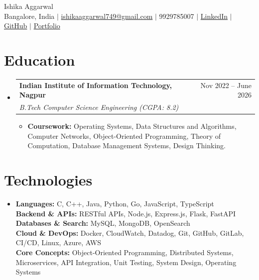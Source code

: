 \documentclass[letterpaper,11pt]{article}
\makeatletter
\newcommand{\resumeItem}[1]{
  \item\small{
    {#1 \vspace{-2pt}}
  }
}
\newcommand{\resumeSubheading}[4]{
  \vspace{-2pt}\item
    \begin{tabular*}{0.97\textwidth}[t]{l@{\extracolsep{\fill}}r}
      \textbf{#1} & #2 \\
      \textit{\small#3} & \textit{\small #4} \\
    \end{tabular*}\vspace{-7pt}
}
\newcommand{\resumeSubHeadingListStart}{\begin{itemize}[leftmargin=0.15in, label={}]}
\newcommand{\resumeSubHeadingListEnd}{\end{itemize}}
\newcommand{\resumeItemListStart}{\begin{itemize}[leftmargin=0.2in, topsep=2pt, itemsep=3.5pt, parsep=0pt, partopsep=0pt]}
\newcommand{\resumeItemListEnd}{\end{itemize}\vspace{-4pt}}
\makeatother
\begin{document}
\begin{center}
    {\Huge Ishika Aggarwal} \\ \vspace{3pt}
    \small
    Bangalore, India $|$
    \href{mailto:ishikaaggarwal749@gmail.com}{ishikaaggarwal749@gmail.com} $|$
    9929785007 $|$
    \href{https://www.linkedin.com/in/your-linkedin}{LinkedIn} $|$
    \href{https://github.com/your-github}{GitHub} $|$
    \href{https://your-portfolio.com}{Portfolio}
\end{center}

\section{Education}
  \resumeSubHeadingListStart
    \resumeSubheading
      {Indian Institute of Information Technology, Nagpur}{Nov 2022 -- June 2026}
      {B.Tech Computer Science Engineering \quad (CGPA: 8.2)}{}
      \resumeItemListStart
        \resumeItem{\textbf{Coursework:} Operating Systems, Data Structures and Algorithms, Computer Networks, Object-Oriented Programming, Theory of Computation, Database Management Systems, Design Thinking.}
      \resumeItemListEnd
  \resumeSubHeadingListEnd

\section{Technologies}
  \resumeSubHeadingListStart
    \item[]
    \small{
      \textbf{Languages:} C, C++, Java, Python, Go, JavaScript, TypeScript \\ \vspace{1pt}
      \textbf{Backend \& APIs:} RESTful APIs, Node.js, Express.js, Flask, FastAPI \\ \vspace{1pt}
      \textbf{Databases \& Search:} MySQL, MongoDB, OpenSearch \\ \vspace{1pt}
      \textbf{Cloud \& DevOps:} Docker, CloudWatch, Datadog, Git, GitHub, GitLab, CI/CD, Linux, Azure, AWS \\ \vspace{1pt}
      \textbf{Core Concepts:} Object-Oriented Programming, Distributed Systems, Microservices, API Integration, Unit Testing, System Design, Operating Systems
    }
  \resumeSubHeadingListEnd
\end{document}
